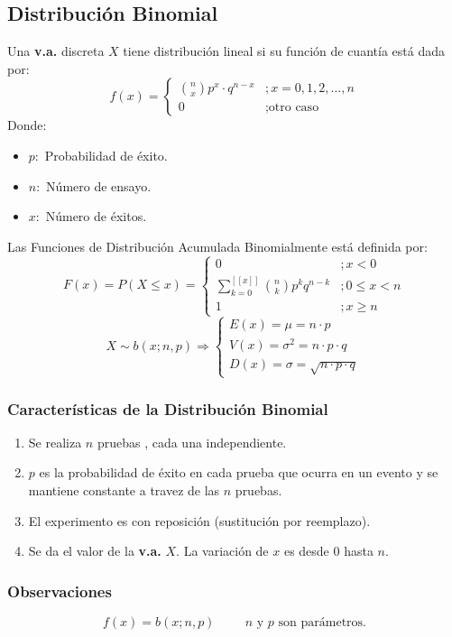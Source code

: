 \subsection{Distribución Binomial}
Una \textbf{v.a.} discreta $X$ tiene distribución lineal si su función de cuantía está dada por:
$$
f(x)=
\begin{cases}
\displaystyle\binom{n}{x} p^x \cdot q^{n-x} &; x=0,1,2,\ldots,n \\
0 &; \text{otro caso}
\end{cases}
$$
Donde:
\begin{itemize}
\item $p:$ Probabilidad de éxito.
\item $n:$ Número de ensayo.
\item $x:$ Número de éxitos.
\end{itemize}
Las Funciones de Distribución Acumulada Binomialmente está definida por:
$$
F(x)=P(X\leq x)=
\begin{cases}
0 &; x<0 \\
\displaystyle\sum_{k=0}^{[\![ x ]\!]}\displaystyle\binom{n}{k} p^k q^{n-k} &; 0\leq x < n \\
1 &; x\geq n
\end{cases}
$$
$$
X \sim b(x;n,p)\Rightarrow 
\begin{cases}
E(x)=\mu = n\cdot p \\
V(x)=\sigma^2 = n\cdot p \cdot q \\
D(x)=\sigma=\sqrt{n\cdot p\cdot q}
\end{cases}
$$

\subsubsection{Características de la Distribución Binomial}
\begin{enumerate}
\item Se realiza $n$ pruebas , cada una independiente.
\item $p$ es la probabilidad de éxito en cada prueba que ocurra en un evento y se mantiene constante a travez de las $n$ pruebas.
\item El experimento es con reposición (sustitución por reemplazo).
\item Se da el valor de la \textbf{v.a.} $X$. La variación de $x$ es desde 0 hasta $n$.

\end{enumerate}

\subsubsection{Observaciones}
$$f(x)=b(x;n,p) \hspace{1cm} n \text{ y } p \text{ son parámetros.}$$
